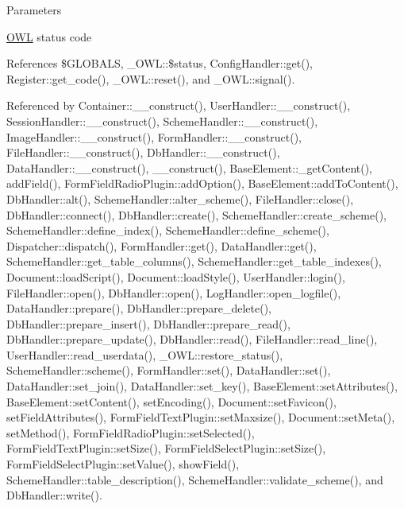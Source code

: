 \begin{DoxyParams}{Parameters}
\item[\mbox{\tt[in]} {\em \$status}]\hyperlink{classOWL}{OWL} status code \item[\mbox{\tt[in]} {\em \$params}]\end{DoxyParams}


References \$GLOBALS, \_\-OWL::\$status, ConfigHandler::get(), Register::get\_\-code(), \_\-OWL::reset(), and \_\-OWL::signal().



Referenced by Container::\_\-\_\-construct(), UserHandler::\_\-\_\-construct(), SessionHandler::\_\-\_\-construct(), SchemeHandler::\_\-\_\-construct(), ImageHandler::\_\-\_\-construct(), FormHandler::\_\-\_\-construct(), FileHandler::\_\-\_\-construct(), DbHandler::\_\-\_\-construct(), DataHandler::\_\-\_\-construct(), \_\-\_\-construct(), BaseElement::\_\-getContent(), addField(), FormFieldRadioPlugin::addOption(), BaseElement::addToContent(), DbHandler::alt(), SchemeHandler::alter\_\-scheme(), FileHandler::close(), DbHandler::connect(), DbHandler::create(), SchemeHandler::create\_\-scheme(), SchemeHandler::define\_\-index(), SchemeHandler::define\_\-scheme(), Dispatcher::dispatch(), FormHandler::get(), DataHandler::get(), SchemeHandler::get\_\-table\_\-columns(), SchemeHandler::get\_\-table\_\-indexes(), Document::loadScript(), Document::loadStyle(), UserHandler::login(), FileHandler::open(), DbHandler::open(), LogHandler::open\_\-logfile(), DataHandler::prepare(), DbHandler::prepare\_\-delete(), DbHandler::prepare\_\-insert(), DbHandler::prepare\_\-read(), DbHandler::prepare\_\-update(), DbHandler::read(), FileHandler::read\_\-line(), UserHandler::read\_\-userdata(), \_\-OWL::restore\_\-status(), SchemeHandler::scheme(), FormHandler::set(), DataHandler::set(), DataHandler::set\_\-join(), DataHandler::set\_\-key(), BaseElement::setAttributes(), BaseElement::setContent(), setEncoding(), Document::setFavicon(), setFieldAttributes(), FormFieldTextPlugin::setMaxsize(), Document::setMeta(), setMethod(), FormFieldRadioPlugin::setSelected(), FormFieldTextPlugin::setSize(), FormFieldSelectPlugin::setSize(), FormFieldSelectPlugin::setValue(), showField(), SchemeHandler::table\_\-description(), SchemeHandler::validate\_\-scheme(), and DbHandler::write().

